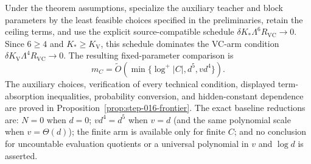 \begin{corollary}\label{cor:frontier}
Under the theorem assumptions, specialize the auxiliary teacher and block
parameters by the least feasible choices specified in the preliminaries,
retain the ceiling terms, and use the explicit source-compatible schedule
$\delta K_*\Lambda^{6}R_{\mathrm{VC}}\to0$.  Since $6\ge4$ and
$K_*\ge K_{\mathrm V}$, this schedule dominates the VC-arm condition
$\delta K_{\mathrm V}\Lambda^{4}R_{\mathrm{VC}}\to0$.  The resulting fixed-parameter
comparison is
\[
 m_C=\widetilde O\!\left(\min\{\log^+|C|,d^5,vd^4\}\right).
\]
The auxiliary choices, verification of every technical condition, displayed
term-absorption inequalities, probability conversion, and hidden-constant
dependence are proved in Proposition~\ref{prop:step-016-frontier}.
The exact baseline reductions are: $N=0$ when $d=0$; $vd^4=d^5$ when
$v=d$ (and the same polynomial scale when $v=\Theta(d)$); the finite arm is
available only for finite $C$; and no conclusion for uncountable evaluation
quotients or a universal polynomial in $v$ and $\log d$ is asserted.
\end{corollary}
